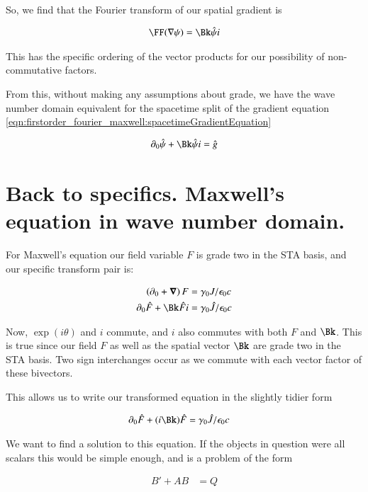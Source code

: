 So, we find that the Fourier transform of our spatial gradient is

\begin{align*}
\FF(\grad \psi) = \Bk \hat{\psi} i
\end{align*}

This has the specific ordering of the vector products for our possibility of non-commutative factors.

From this, without making any assumptions about grade, we have the wave number domain equivalent
for the spacetime split of the gradient equation \ref{eqn:firstorder_fourier_maxwell:spacetimeGradientEquation}

\begin{align}\label{eqn:firstorder_fourier_maxwell:waveDomainGeneral}
\partial_0 \hat{\psi} + \Bk \hat{\psi} i = \hat{g}
\end{align}

\section{Back to specifics.  Maxwell's equation in wave number domain. }

For Maxwell's equation our field variable $F$ is grade two in the STA basis, and our specific transform pair is:

\begin{align}
\left(\partial_0 + \spacegrad \right) F &= \gamma_0 J/\epsilon_0 c \\
\partial_0 \hat{F} + \Bk \hat{F} i &= \gamma_0 \hat{J}/ \epsilon_0 c
\end{align}

Now, $\exp(i\theta)$ and $i$ commute, and $i$ also commutes with both $F$ and $\Bk$.  This is true since our field $F$ as well as the spatial vector $\Bk$ are grade two in the STA basis.  
Two sign interchanges occur as we commute with each vector factor of these
bivectors.

This allows us to write our transformed equation in the slightly tidier form

\begin{align}\label{eqn:firstorder_fourier_maxwell:toSolve}
\partial_0 \hat{F} + (i \Bk) \hat{F} &= \gamma_0 \hat{J}/ \epsilon_0 c
\end{align}

We want to find a solution to this equation.  If the objects in question were all scalars this would be simple enough, and is a problem of the form

\begin{align}\label{eqn:firstorder_fourier_maxwell:firstOrder}
B' + A B &= Q
\end{align}

